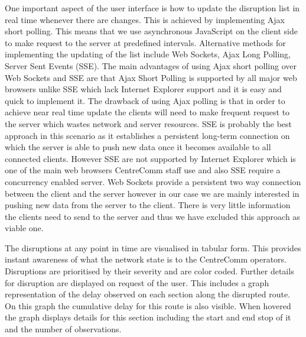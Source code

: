 One important aspect of the user interface is how to update the disruption list in real time whenever there are changes. This is achieved by implementing Ajax short polling. This means that we use asynchronous JavaScript on the client side to make request to the server at predefined intervals. Alternative methods for implementing the updating of the list include Web Sockets, Ajax Long Polling, Server Sent Events (SSE). The main advantages of using Ajax short polling over Web Sockets and SSE are that Ajax Short Polling is supported by all major web browsers unlike SSE which lack Internet Explorer support and it is easy and quick to implement it. The drawback of using Ajax polling is that in order to achieve near real time update the clients will need to make frequent request to the server which wastes network and server resources. SSE is probably the best approach in this scenario as it establishes a persistent long-term connection on which the server is able to push new data once it becomes available to all connected clients. However SSE are not supported by Internet Explorer which is one of the main web browsers CentreComm staff use and also SSE require a concurrency enabled server. Web Sockets provide a persistent two way connection between the client and the server however in our case we are mainly interested in pushing new data from the server to the client. There is very little information the clients need to send to the server and thus we have excluded this approach as viable one.

The disruptions at any point in time are visualised in tabular form. This provides instant awareness of what the network state is to the CentreComm operators. Disruptions are prioritised by their severity and are color coded. Further details for disruption are displayed on request of the user. This includes a graph representation of the delay observed on each section along the disrupted route. On this graph the cumulative delay for this route is also visible. When hovered the graph displays details for this section including the start and end stop of it and the number of observations.

